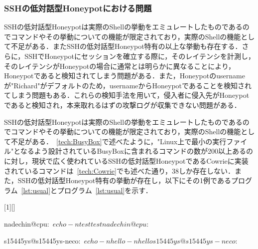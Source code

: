 \subsubsection{SSHの低対話型Honeypotにおける問題}
\label{appr:problemofSshLowHoneypot}
SSHの低対話型Honeypotは実際のShellの挙動をエミュレートしたものであるのでコマンドやその挙動についての機能が限定されており，実際のShellの機能として不足がある．またSSHの低対話型Honeypot特有の以上な挙動も存在する．さらに，SSHでHoneypotにセッションを確立する際に，そのレイテンシを計測し，そのレイテンシがHoneypotの場合に通常とは明らかに異なることにより，Honeypotであると検知されてしまう問題がある．また，Honeypotのusernameが"Richard"がデフォルトのため，usernameからHoneypotであることを検知されてしまう問題もある．これらの検知手法を用いて，侵入者に侵入先がHoneypotであると検知され，本来取れるはずの攻撃ログが収集できない問題がある．

\label{appr:LowHoneypotLatency}

\label{appr:LowHoneypotUsername}

\label{appr:LowHoneypotCommand}
SSHの低対話型Honeypotは実際のShellの挙動をエミュレートしたものであるのでコマンドやその挙動についての機能が限定されており，実際のShellの機能として不足がある．~\ref{tech:BusyBox}で述べたように，"Linux上で最小の実行ファイル"となるよう設計されているBusyBoxに含まれるコマンドの数が200以上あるのに対し，現状で広く使われているSSHの低対話型HoneypotであるCowrieに実装されているコマンドは~\ref{tech:Cowrie}でも述べた通り，38しか存在しない．また，SSHの低対話型Honeypot特有の挙動が存在し，以下にその1例であるプログラム~\ref{lst:usual}とプログラム~\ref{lst:usual}を示す．

\vspace{5mm}
[1][]
    {\lstset{
        frame=single,
        basicstyle=\ttfamily,
        numbers=left,
        numbersep=10pt,
        tabsize=2,
        extendedchars=true,
        xleftmargin=17pt,
        framexleftmargin=17pt,
        #1
    }
}{}

\begin{mylisting}[label=usual,language=sh,caption=正しいShellの挙動]
nadechin@cpu:~$ echo -n test
testnadechin@cpu:~$
\end{mylisting}

\begin{mylisting}[label=kippo,language=sh,caption=Kippo特有の異常な挙動の例]
s15445ys@s15445ys-neco:~$ echo -n hello
-n hello
s15445ys@s15445ys-neco:~$
\end{mylisting}

